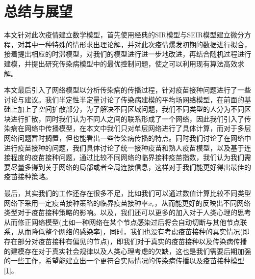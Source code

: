 \documentclass[UTF8]{ctexart}
\begin{document}
\section{总结与展望}
本文针对此次疫情建立数学模型，首先使用经典的SIR模型与SEIR模型建立微分方程，对其中一种特殊的情形求出理论解，并对此次疫情爆发初期的数据进行拟合，接着提出相应的时滞模型，对我们的模型进行进一步地改进，再结合随机过程进行建模，并提出研究传染病模型中的最优控制问题，使之可以利用现有算法高效求解。
\par 本文最后引入了网络模型以分析传染病的传播过程，针对疫苗接种问题进行了一些讨论与建议。我们半定性半定量讨论了传染病建模的平均场网络模型，在前面的基础上加上了空间扩散部分，为了解决不同区域问题，我们不同类型的人分为不同区块进行扩散，同时我们认为不同人之间的联系形成了一个网络，因此我们引入了传染病在网络中传播模型，在本文中我们只对单层网络进行了具体计算，而对于多层网络问题暂时搁置，但也能看出一些传染病传播的特点。同时我们讨论了在网络中进行疫苗接种的问题，我们具体讨论了统一接种疫苗和熟人疫苗模型，以及基于连接程度的疫苗接种问题，通过比较不同网络的临界接种疫苗指数，我们认为我们需要尽量多得到关于网络的局部或者全局连接信息，这样对于我们能更好得出最佳的疫苗接种策略。
\par 最后，其实我们的工作还存在很多不足，比如我们可以通过数值计算比较不同类型网络下采用一定疫苗接种策略的临界疫苗接种率$x_{c}$，从而能更好的反映出不同网络类型对于疫苗接种策略的影响。以及，我们还可以更多的加入对于人类心理的思考从而修正网络模型(比如一种网络在某个节点感染过后将会自动切断与其他节点联系，从而降低整个网络的感染率)，同时，我们也没有考虑疫苗接种的真实情况(即存在部分对疫苗接种有偏见的节点)，即我们对于真实的疫苗接种以及传染病传播的建模存在对于真实社会规律以及人类心理考虑的欠缺，这也是我们需要后期加强的一些工作，希望能建立出一个更符合实际情况的传染病传播以及疫苗接种模型\ref{1}。
\newpage
\end{document}
